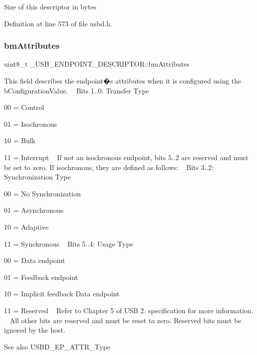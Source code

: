 Size of this descriptor in bytes 

Definition at line 573 of file usbd.\+h.

\mbox{\label{struct___u_s_b___e_n_d_p_o_i_n_t___d_e_s_c_r_i_p_t_o_r_a608be5427fa3b22e530f223933621c5e}} 
\subsubsection{\texorpdfstring{bm\+Attributes}{bmAttributes}}
{\footnotesize\ttfamily uint8\+\_\+t \+\_\+\+U\+S\+B\+\_\+\+E\+N\+D\+P\+O\+I\+N\+T\+\_\+\+D\+E\+S\+C\+R\+I\+P\+T\+O\+R\+::bm\+Attributes}

This field describes the endpoint�s attributes when it is configured using the b\+Configuration\+Value. ~\newline
 Bits 1..0\+: Transfer Type \begin{DoxyItemize}
\item 00 = Control \item 01 = Isochronous \item 10 = Bulk \item 11 = Interrupt ~\newline
 If not an isochronous endpoint, bits 5..2 are reserved and must be set to zero. If isochronous, they are defined as follows\+: ~\newline
 Bits 3..2\+: Synchronization Type \item 00 = No Synchronization \item 01 = Asynchronous \item 10 = Adaptive \item 11 = Synchronous ~\newline
 Bits 5..4\+: Usage Type \item 00 = Data endpoint \item 01 = Feedback endpoint \item 10 = Implicit feedback Data endpoint \item 11 = Reserved ~\newline
 Refer to Chapter 5 of U\+SB 2. specification for more information. ~\newline
 All other bits are reserved and must be reset to zero. Reserved bits must be ignored by the host. ~\newline
 \begin{DoxySeeAlso}{See also}
U\+S\+B\+D\+\_\+\+E\+P\+\_\+\+A\+T\+T\+R\+\_\+\+Type 
\end{DoxySeeAlso}
\end{DoxyItemize}


